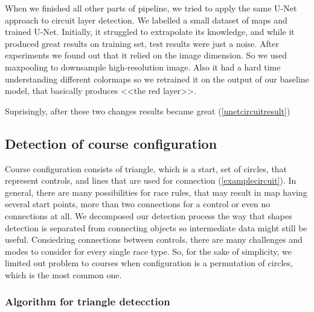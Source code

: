 \documentclass[a4paper,12pt]{extarticle}
\begin{document}
When we finished all other parts of pipeline, we tried to apply the same U-Net approach to circuit layer detection.
We labelled a small dataset of maps and trained U-Net.
Initially, it struggled to extrapolate its knowledge, and while it produced great results on training set, test results were just a noise.
After experiments we found out that it relied on the image dimension. So we used maxpooling to downsample high-resolution image.
Also it had a hard time understanding different colormaps so we retrained it on the output of our baseline model, that basically produces <<the red layer>>. 

Suprisingly, after these two changes results became great (\cref{unetcircuitresult})

\subsection{Detection of course configuration}

Course configuration consists of triangle, which is a start, set of circles, that represent controls, and lines that are used for connection (\cref{examplecircuit}).
In general, there are many possibilities for race rules, that may result in map having several start points, more than two connections for a control or even no connections at all.
We decomposed our detection process the way that shapes detection is separated from connecting objects so intermediate data might still be useful.
Consiedring connections between controls, there are many challenges and modes to consider for every single race type.
So, for the sake of simplicity, we limited out problem to courses when  configuration is a permutation of circles, which is the most common one.

\subsubsection{Algorithm for triangle detecction}
\end{document}
